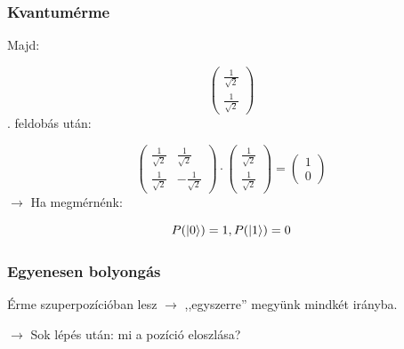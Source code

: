 \documentclass[aspectratio=169]{beamer}
\begin{document}
\begin{frame}
  \frametitle{Kvantumérme}

  Majd:

  \[\begin{pmatrix}
      \frac{1}{\sqrt{2}} \\ \frac{1}{\sqrt{2}}
    \end{pmatrix}\]
  . feldobás után:

  \[\begin{pmatrix} \frac{1}{\sqrt{2}} & \frac{1}{\sqrt{2}}
      \\ \frac{1}{\sqrt{2}} & -\frac{1}{\sqrt{2}}\end{pmatrix} \cdot
    \begin{pmatrix} \frac{1}{\sqrt{2}} \\ \frac{1}{\sqrt{2}} \end{pmatrix} = \begin{pmatrix}
      1 \\ 0
    \end{pmatrix} \]
  \pause
  $\rightarrow$ Ha megmérnénk:

  \[P(\ket{0}) = 1, P(\ket{1}) = 0\]


\end{frame}

\begin{frame}
  \frametitle{Egyenesen bolyongás}


  \newcommand*{\TickSize}{2pt}%

  \begin{center}


  \end{center}
  Érme szuperpozícióban lesz $\rightarrow$ ,,egyszerre'' megyünk mindkét irányba.

  \pause
  $\rightarrow$ Sok lépés után: mi a pozíció eloszlása?

\end{frame}
\end{document}
